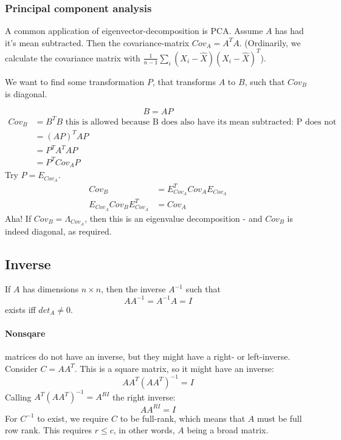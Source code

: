 \subsubsection{Principal component analysis}
A common application of eigenvector-decomposition is PCA.
Assume $A$ has had it's mean subtracted.
Then the covariance-matrix $Cov_A = A^TA$. (Ordinarily, we calculate the covariance matrix with $\frac{1}{n-1} \sum_i (X_i - \hat{X}) (X_i - \hat{X})^T $).

We want to find some transformation $P$, that transforms $A$ to $B$, such that $Cov_B$ is diagonal.

\begin{equation}
    B = A P
\end{equation}
\begin{equation}
    \begin{aligned}
        Cov_B   &= B^T B \text{ this is allowed because B does also have its mean subtracted: P does not translate} \\
                &= (A P)^T A P \\
                &= P^T A^T A P \\
                &= P^T Cov_A P
    \end{aligned}
\end{equation}
Try $P = E_{Cov_A}$. 
\begin{equation}
    \begin{aligned}
        Cov_B                       &= E_{Cov_A}^T Cov_A E_{Cov_A} \\
        E_{Cov_A} Cov_B E_{Cov_A}^T &= Cov_A
    \end{aligned}
\end{equation}
Aha! If $Cov_B = \Lambda_{Cov_A}$, then this is an eigenvalue decomposition - and $Cov_B$ is indeed diagonal, as required.








\subsection{Inverse}

If $A$ has dimensions $n \times n$, then the inverse $A^{-1}$ such that
$$ A A^{-1} = A^{-1} A = I $$
exists iff $det_A \neq 0$.

\paragraph{Nonsqare} matrices do not have an inverse, but they might have a right- or left-inverse.
Consider $C = A A^T$. This is a square matrix, so it might have an inverse:
$$ A A^T (A A^T)^{-1} = I $$
Calling $A^T (A A^T)^{-1} = A^{RI}$ the right inverse:
$$ A A^{RI} = I $$
For $C^{-1}$ to exist, we require $C$ to be full-rank, which means that $A$ must be full row rank. This  requires $r \leq c$, in other words, $A$ being a broad matrix.

